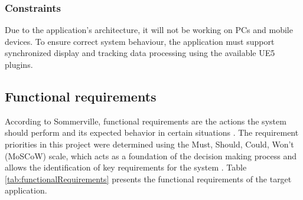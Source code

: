 \subsubsection{Constraints}
Due to the application's architecture, it will not be working on PCs and mobile devices.
To ensure correct system behaviour, the application must support synchronized display and tracking data processing using the available UE5 plugins.  
\subsection{Functional requirements}
According to Sommerville, functional requirements are the actions the system should perform and its expected behavior in certain situations \cite{sommerville2016software}.
The requirement priorities in this project were determined using the Must, Should, Could, Won't (MoSCoW) scale, which acts as a foundation of the decision making process and allows the identification of key requirements for the system \cite{craddock2014dsdm}.
Table \ref{tab:functionalRequirements} presents the functional requirements of the target application.
